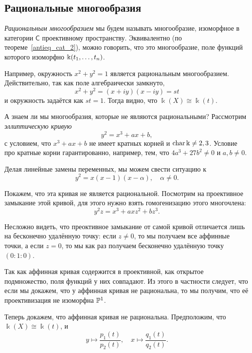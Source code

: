 	 \subsection{Рациональные многообразия}

	 \begin{definition} 
	 	\emph{Рациональным многообразием} мы будем называть многообразие, изоморфное в категории $\mathsf{C}$ проективному пространству. Эквивалентно (по теореме~\ref{antieq_cat_2}), можно говорить, что это многообразие, поле функций которого изоморфно $\Bbbk(t_1, \ldots, t_n)$. 
	 \end{definition}

	 \begin{example}
	 	Например, окружность $x^2 + y^2 = 1$ является рациональным многообразием. Действительно, так как поле алгебраически замкнуто, 
	 	\[
	 		x^2 + y^2 = (x + iy)(x - iy) = st
	 	\]
	 	и окружность задаётся как $st = 1$. Тогда видно, что $\Bbbk(X) \cong \Bbbk(t)$.
	 \end{example}

	 А знаем ли мы многообразия, которые не являются рациональными? Рассмотрим \emph{эллиптическую кривую}
	 \[
	 	y^2 = x^3 + ax + b,
	 \]
	 с условием, что $x^3 + ax + b$ не имеет кратных корней и $\operatorname{char}{\Bbbk} \neq 2, 3$. Условие про кратные корни гарантированно, например, тем, что $4a^3 + 27b^2 \neq 0$ и $a, b \neq 0$.

	 Делая линейные замены переменных, мы можем свести ситуацию к 
	 \[
	 	y^2 = x(x - 1)(x - \alpha), \quad \alpha \neq 0.
	 \]

	 Покажем, что эта кривая не является рациональной. Посмотрим на проективное замыкание этой кривой, для этого нужно взять гомогенизацию этого многочлена: 
	 \[
	 	y^2z = x^3 + axz^2 + bz^3.
	 \]

	 Несложно видеть, что преоктивное замыкание от самой кривой отличается лишь на бесконечно удалённую точку: если $z \neq 0$, то мы получаем все аффинные точки, а если $z = 0$, то мы как раз получаем бесконечно удалённую точку $(0 : 1 : 0)$. 

	 Так как аффинная кривая содержится в проективной, как открытое подмножество, поля функций у них совпадают. Из этого в частности следует, что если мы докажем, что у аффинная кривая не рациональна, то мы получим, что её проективизация не изоморфна $\mathbb{P}^1$.

	 Теперь докажем, что аффинная кривая не рациональна. Предположим, что $\Bbbk(X) \cong \Bbbk(t)$, и
	 \[
	 	y \mapsto \frac{p_1(t)}{p_2(t)}, \quad x \mapsto \frac{q_1(t)}{q_2(t)}.
	 \]

